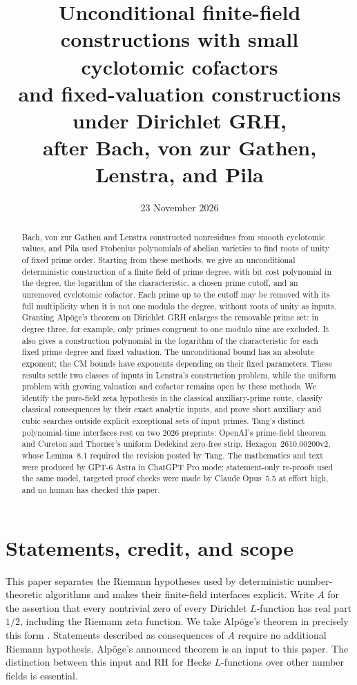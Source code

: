 \documentclass[11pt]{article}
\title{Unconditional finite-field constructions with small cyclotomic cofactors\\
and fixed-valuation constructions under Dirichlet GRH,\\
after Bach, von zur Gathen, Lenstra, and Pila}
\author{}
\date{23 November 2026}
\theoremstyle{definition}
\theoremstyle{remark}
\begin{document}
\maketitle
\begin{abstract}
Bach, von zur Gathen and Lenstra constructed nonresidues from smooth
cyclotomic values, and Pila used Frobenius polynomials of abelian
varieties to find roots of unity of fixed prime order. Starting from
these methods, we give an unconditional deterministic construction of
a finite field of prime degree, with bit cost polynomial in the degree,
the logarithm of the characteristic, a chosen prime cutoff, and an
unremoved cyclotomic cofactor. Each prime up to the cutoff may be
removed with its full multiplicity when it is not one modulo the
degree, without roots of unity as inputs. Granting Alp\"oge's theorem
on Dirichlet GRH enlarges the removable prime set: in degree three,
for example, only primes congruent to one modulo nine are excluded.
It also gives a construction polynomial in the logarithm of the
characteristic for each fixed prime degree and fixed valuation. The unconditional bound
has an absolute exponent; the CM bounds have exponents depending on
their fixed parameters. These results settle two classes of inputs in Lenstra's
construction problem, while the uniform problem with growing valuation
and cofactor remains open by these methods. We identify the pure-field
zeta hypothesis in the classical auxiliary-prime route, classify
classical consequences by their exact analytic inputs, and prove short
auxiliary and cubic searches outside explicit exceptional sets of
input primes. Tang's distinct polynomial-time interfaces rest on two
2026 preprints: OpenAI's prime-field theorem and Cureton and Thorner's
uniform Dedekind zero-free strip, Hexagon~2610.00200v2, whose Lemma~8.1
required the revision posted by Tang. The mathematics and text were
produced by GPT-6 Astra in ChatGPT Pro mode; statement-only re-proofs
used the same model, targeted proof checks were made by Claude Opus~5.5
at effort high, and no human has checked this paper.
\end{abstract}

\section{Statements, credit, and scope}
\label{sec:main-statements}
This paper separates the Riemann hypotheses used by deterministic
number-theoretic algorithms and makes their finite-field interfaces explicit.
Write $A$ for the assertion that every nontrivial zero of every Dirichlet
$L$-function has real part $1/2$, including the Riemann zeta function.
We take Alp\"oge's theorem in precisely this form
\citep[p.~1]{Alpoge2026}.  Statements described as consequences of $A$
require no additional Riemann hypothesis.  Alp\"oge's announced theorem
is an input to this paper.  The distinction between this
input and RH for Hecke $L$-functions over other number fields is essential.
\end{document}
